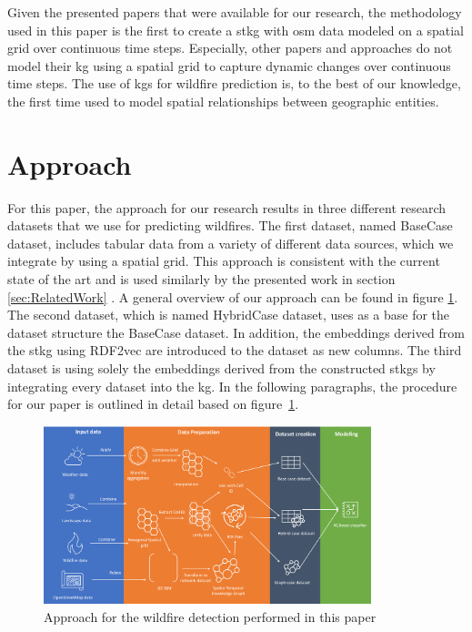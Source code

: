 \documentclass[
]{ceurart}
\begin{document}
Given the presented papers that were available for our research, the methodology used in this paper is the first to create a \gls*{stkg} with \gls*{osm} data modeled on a spatial grid over continuous time steps. Especially, other papers and approaches do not model their \gls*{kg} using a spatial grid to capture dynamic changes over continuous time steps. The use of \glspl*{kg} for wildfire prediction is, to the best of our knowledge, the first time used to model spatial relationships between geographic entities. %

\section{Approach} \label{cha:Approach}
For this paper, the approach for our research results in three different research datasets that we use for predicting wildfires. The first dataset, named BaseCase dataset, includes tabular data from a variety of different data sources, which we integrate by using a spatial grid. This approach is consistent with the current state of the art and is used similarly by the presented work in section \ref{sec:RelatedWork} \cite{Nami.2018, Kim.2019}. A general overview of our approach can be found in figure \ref{fig:Approach}. The second dataset, which is named HybridCase dataset, uses as a base for the dataset structure the BaseCase dataset. In addition, the embeddings derived from the \gls*{stkg} using RDF2vec are introduced to the dataset as new columns. The third dataset is using solely the embeddings derived from the constructed \glspl*{stkg} by integrating every dataset into the \gls*{kg}. In the following paragraphs, the procedure for our paper is outlined in detail based on figure~\ref{fig:Approach}.

\begin{figure}[t]
	\centering
	\includegraphics[width = 0.85\textwidth]{img/Approach.png}
	\caption{Approach for the wildfire detection performed in this paper}
	\label{fig:Approach}
\end{figure}
\end{document}

